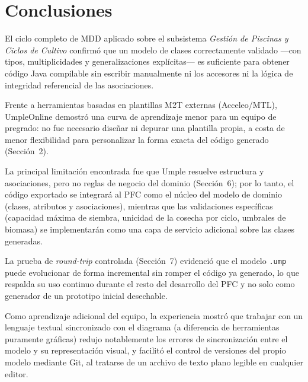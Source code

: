 \documentclass[11pt,a4paper]{article}
\begin{document}
\section{Conclusiones}
\label{sec:conclusiones}

El ciclo completo de MDD aplicado sobre el subsistema \emph{Gestión de Piscinas y Ciclos de Cultivo} confirmó que un modelo de clases correctamente validado —con tipos, multiplicidades y generalizaciones explícitas— es suficiente para obtener código Java compilable sin escribir manualmente ni los accesores ni la lógica de integridad referencial de las asociaciones.

Frente a herramientas basadas en plantillas M2T externas (Acceleo/MTL), UmpleOnline demostró una curva de aprendizaje menor para un equipo de pregrado: no fue necesario diseñar ni depurar una plantilla propia, a costa de menor flexibilidad para personalizar la forma exacta del código generado (Sección~2).

La principal limitación encontrada fue que Umple resuelve estructura y asociaciones, pero no reglas de negocio del dominio (Sección~6); por lo tanto, el código exportado se integrará al PFC como el núcleo del modelo de dominio (clases, atributos y asociaciones), mientras que las validaciones específicas (capacidad máxima de siembra, unicidad de la cosecha por ciclo, umbrales de biomasa) se implementarán como una capa de servicio adicional sobre las clases generadas.

La prueba de \emph{round-trip} controlada (Sección~7) evidenció que el modelo \texttt{.ump} puede evolucionar de forma incremental sin romper el código ya generado, lo que respalda su uso continuo durante el resto del desarrollo del PFC y no solo como generador de un prototipo inicial desechable.

Como aprendizaje adicional del equipo, la experiencia mostró que trabajar con un lenguaje textual sincronizado con el diagrama (a diferencia de herramientas puramente gráficas) redujo notablemente los errores de sincronización entre el modelo y su representación visual, y facilitó el control de versiones del propio modelo mediante Git, al tratarse de un archivo de texto plano legible en cualquier editor.



\end{document}
